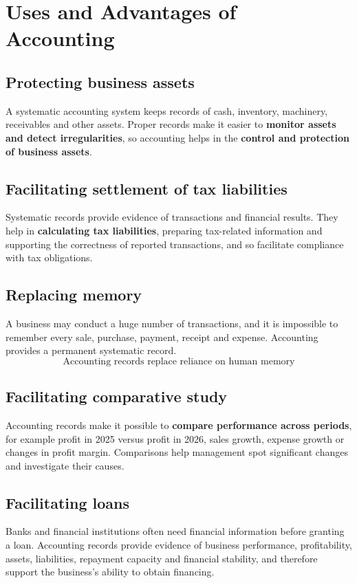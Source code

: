 \documentclass[11pt,a4paper]{article}
\begin{document}
\section{Uses and Advantages of Accounting}

\subsection{Protecting business assets}
A systematic accounting system keeps records of cash, inventory, machinery, receivables and
other assets. Proper records make it easier to \textbf{monitor assets and detect irregularities}, so
accounting helps in the \textbf{control and protection of business assets}.

\subsection{Facilitating settlement of tax liabilities}
Systematic records provide evidence of transactions and financial results. They help in
\textbf{calculating tax liabilities}, preparing tax-related information and supporting the
correctness of reported transactions, and so facilitate compliance with tax obligations.

\subsection{Replacing memory}
A business may conduct a huge number of transactions, and it is impossible to remember every
sale, purchase, payment, receipt and expense. Accounting provides a permanent systematic record.
\[
\boxed{\text{Accounting records replace reliance on human memory}}
\]

\subsection{Facilitating comparative study}
Accounting records make it possible to \textbf{compare performance across periods}, for example profit
in 2025 versus profit in 2026, sales growth, expense growth or changes in profit margin.
Comparisons help management spot significant changes and investigate their causes.

\subsection{Facilitating loans}
Banks and financial institutions often need financial information before granting a loan.
Accounting records provide evidence of business performance, profitability, assets, liabilities,
repayment capacity and financial stability, and therefore support the business's ability to
obtain financing.
\end{document}

